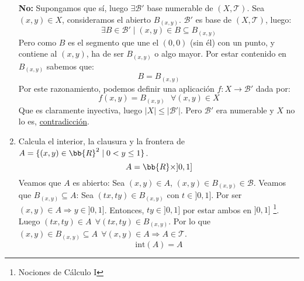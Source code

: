 \documentclass[12pt]{article}
\newcounter{ejercicio}[section] %
\newcounter{ejercicio}
\begin{document}
\begin{ejercicio}[4.5 puntos]
\begin{enumerate}[label=(\alph*)]
                \noindent \textbf{No:}\newline
                Supongamos que sí, luego $\exists \mathcal{B}'$ base numerable de $(X, \mathcal{T})$.\newline
                Sea $(x,y) \in X$, consideramos el abierto $B_{(x,y)}$. $\mathcal{B}'$ es base de $(X, \mathcal{T})$, luego:
                $$\exists B \in \mathcal{B}' \mid (x,y) \in B \subseteq B_{(x,y)}$$
                Pero como $B$ es el segmento que une el $(0,0)$ (sin él) con un punto, y contiene al $(x,y)$, ha de ser $B_{(x,y)}$ o algo mayor. Por estar contenido en $B_{(x,y)}$ sabemos que:
                $$B = B_{(x,y)}$$
                Por este razonamiento, podemos definir una aplicación $f:X \rightarrow \mathcal{B}'$ dada por:
                $$f(x,y) = B_{(x,y)}~~~\forall (x,y) \in X$$
                Que es claramente inyectiva, luego $|X| \leq |\mathcal{B}'|$. Pero $\mathcal{B}'$ era numerable y $X$ no lo es, \underline{contradicción}.
                
            \item Calcula el interior, la clausura y la frontera de $A = \{ (x,y) \in \bb{R}^2 \mid 0 < y \leq 1\}$.\\

                \noindent
                $$A = \bb{R} \times ]0,1]$$
                Veamos que $A$ es abierto:\newline
                Sea $(x,y) \in A$, $(x,y) \in B_{(x,y)} \in \mathcal{B}$. Veamos que $B_{(x,y)} \subseteq A$:\newline
                Sea $(tx, ty) \in B_{(x,y)}$ con $t \in ]0,1]$. Por ser $(x,y) \in A \Rightarrow y \in ]0,1]$.\newline
                Entonces, $ty \in ]0,1]$ por estar ambos en $]0,1]$ \footnote{Nociones de Cálculo I}.\newline
                Luego $(tx, ty) \in A~~\forall (tx, ty) \in B_{(x,y)}$.\newline
                Por lo que $(x,y) \in B_{(x,y)} \subseteq A~~\forall (x,y) \in A \Rightarrow A \in \mathcal{T}$.
                $$\mathrm{int}(A) = A$$


\end{enumerate}
\end{ejercicio}
\end{document}
